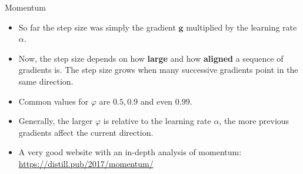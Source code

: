 \documentclass[11pt,compress,t,notes=noshow, xcolor=table]{beamer}
\begin{document}
\begin{vbframe}{Momentum}
  \begin{itemize}
    \item So far the step size was simply the gradient $\mathbf{g}$ multiplied by the learning rate $\alpha$.
    \item Now, the step size depends on how \textbf{large} and how \textbf{aligned} a sequence of gradients is. The step size grows when many successive gradients point in the same direction.
    \item Common values for $\varphi$ are $0.5, 0.9$ and even $0.99$.
    \item Generally, the larger $\varphi$ is relative to the learning rate $\alpha$, the more previous gradients affect the current direction.
    \item A very good website with an in-depth analysis of momentum: \url{https://distill.pub/2017/momentum/}

\end{itemize}
\end{vbframe}
\end{document}
